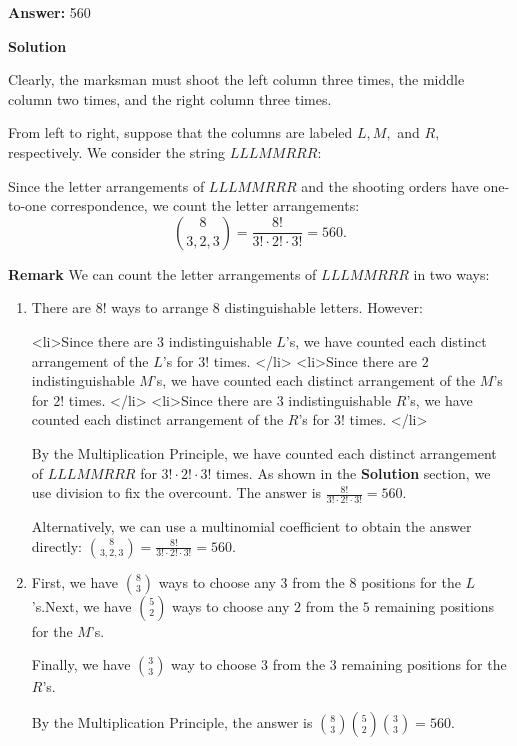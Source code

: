\begin{enumerate}
 \textbf{Answer: }560



\textbf{Solution}

Clearly, the marksman must shoot the left column three times, the middle column two times, and the right column three times.

 From left to right, suppose that the columns are labeled $L,M,$ and $R,$ respectively. We consider the string $LLLMMRRR:$

 Since the letter arrangements of $LLLMMRRR$ and the shooting orders have one-to-one correspondence, we count the letter arrangements: 
 \[\binom{8}{3,2,3} = \frac{8!}{3!\cdot2!\cdot3!} = \boxed{560}.\]

 \textbf{Remark} We can count the letter arrangements of $LLLMMRRR$ in two ways:

 
            \begin{enumerate} 
        \item There are $8!$ ways to arrange $8$ distinguishable letters. However: 

 
            \begin{itemize}<li>Since there are $3$ indistinguishable $L$'s, we have counted each distinct arrangement of the $L$'s for $3!$ times. </li>
<li>Since there are $2$ indistinguishable $M$'s, we have counted each distinct arrangement of the $M$'s for $2!$ times. </li>
<li>Since there are $3$ indistinguishable $R$'s, we have counted each distinct arrangement of the $R$'s for $3!$ times. </li>

            \end{itemize}
            By the Multiplication Principle, we have counted each distinct arrangement of $LLLMMRRR$ for $3!\cdot2!\cdot3!$ times. As shown in the \textbf{Solution} section, we use division to fix the overcount. The answer is $\frac{8!}{3!\cdot2!\cdot3!} = 560.$ 

 Alternatively, we can use a multinomial coefficient to obtain the answer directly: $\binom{8}{3,2,3}=\frac{8!}{3!\cdot2!\cdot3!} = 560.$


        \item First, we have $\binom83$ ways to choose any $3$ from the $8$ positions for the $L$'s.Next, we have $\binom52$ ways to choose any $2$ from the $5$ remaining positions for the $M$'s.

 Finally, we have $\binom33$ way to choose $3$ from the $3$ remaining positions for the $R$'s.

 By the Multiplication Principle, the answer is $\binom83\binom52\binom33=560.$



\end{enumerate}
\end{enumerate}
